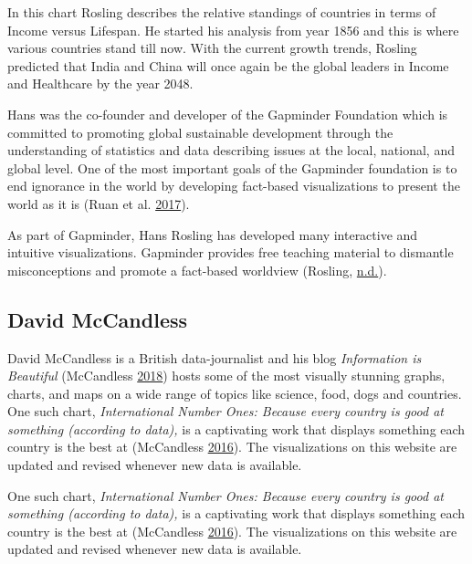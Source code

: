 \documentclass[]{book}
\begin{document}
In this chart Rosling describes the relative standings of countries in terms of Income versus Lifespan. He started his analysis from year 1856 and this is where various countries stand till now. With the current growth trends, Rosling predicted that India and China will once again be the global leaders in Income and Healthcare by the year 2048.

Hans was the co-founder and developer of the Gapminder Foundation which is committed to promoting global sustainable development through the understanding of statistics and data describing issues at the local, national, and global level. One of the most important goals of the Gapminder foundation is to end ignorance in the world by developing fact-based visualizations to present the world as it is (Ruan et al. \protect\hyperlink{ref-gapminder}{2017}).

As part of Gapminder, Hans Rosling has developed many interactive and intuitive visualizations. Gapminder provides free teaching material to dismantle misconceptions and promote a fact-based worldview (Rosling, \protect\hyperlink{ref-han_rosling_teaching}{n.d.}).

\hypertarget{david-mccandless}{%
\subsection{David McCandless}\label{david-mccandless}}

David McCandless is a British data-journalist and his blog \emph{Information is Beautiful} (McCandless \protect\hyperlink{ref-info_beautiful}{2018}) hosts some of the most visually stunning graphs, charts, and maps on a wide range of topics like science, food, dogs and countries. One such chart, \emph{International Number Ones: Because every country is good at something (according to data),} is a captivating work that displays something each country is the best at (McCandless \protect\hyperlink{ref-country_chart}{2016}). The visualizations on this website are updated and revised whenever new data is available.

One such chart, \emph{International Number Ones: Because every country is good at something (according to data),} is a captivating work that displays something each country is the best at (McCandless \protect\hyperlink{ref-country_chart}{2016}). The visualizations on this website are updated and revised whenever new data is available.
\end{document}
